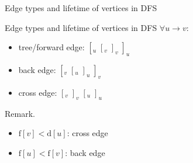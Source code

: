 \begin{frame}{Edge types and lifetime of vertices in DFS}
  \begin{exampleblock}{Edge types and lifetime of vertices in DFS }
    $\forall u \to v$:
    \begin{itemize}
      \item tree/forward edge: $[_{u}\; [_{v}\; ]_{v}\; ]_{u}$
      \item back edge: $[_{v}\; [_{u}\; ]_{u}\; ]_{v}$
      \item cross edge: $[_{v}\; ]_{v}\; [_{u}\; ]_{u}$
    \end{itemize}
  \end{exampleblock}

  \begin{alertblock}{Remark.}
    \begin{itemize}
      \item $\text{f}[v] < \text{d}[u]$: cross edge
      \item $\text{f}[u] < \text{f}[v]$: back edge
    \end{itemize}
  \end{alertblock}
\end{frame}
